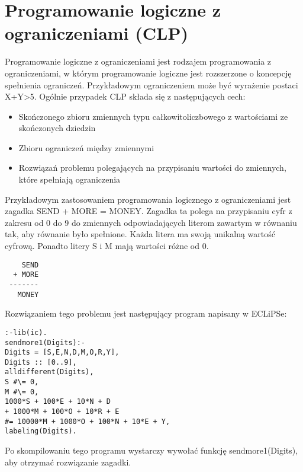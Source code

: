 \chapter{Programowanie logiczne z ograniczeniami (CLP)}

Programowanie logiczne z ograniczeniami\cite{CLP} jest rodzajem programowania z ograniczeniami, w którym programowanie logiczne jest rozszerzone o koncepcję spełnienia ograniczeń. Przykładowym ograniczeniem może być wyrażenie postaci X+Y>5. 
Ogólnie przypadek CLP składa się z następujących cech:
\begin{itemize}
\item{Skończonego zbioru zmiennych typu całkowitoliczbowego z wartościami ze skończonych dziedzin}
\item{Zbioru ograniczeń między zmiennymi}
\item{Rozwiązań problemu polegających na przypisaniu wartości do zmiennych, które spełniają ograniczenia}
\end{itemize}
Przykładowym zastosowaniem programowania logicznego z ograniczeniami jest zagadka SEND + MORE  = MONEY.\cite{Eclipse} Zagadka ta polega na przypisaniu cyfr z zakresu od 0 do 9 do zmiennych odpowiadających literom zawartym w równaniu tak, aby równanie było spełnione. Każda litera ma swoją unikalną wartość cyfrową. Ponadto litery S i M mają wartości różne od 0.


\begin{verbatim}
    SEND
  + MORE
 -------
   MONEY
\end{verbatim}
\newpage
Rozwiązaniem tego problemu jest następujący program napisany w ECLiPSe:
\begin{verbatim}
:-lib(ic).
sendmore1(Digits):-
Digits = [S,E,N,D,M,O,R,Y],
Digits :: [0..9],
alldifferent(Digits),
S #\= 0,
M #\= 0,
1000*S + 100*E + 10*N + D
+ 1000*M + 100*O + 10*R + E
#= 10000*M + 1000*O + 100*N + 10*E + Y,
labeling(Digits).
\end{verbatim}
Po skompilowaniu tego programu wystarczy wywołać funkcję sendmore1(Digits), aby otrzymać rozwiązanie zagadki.

